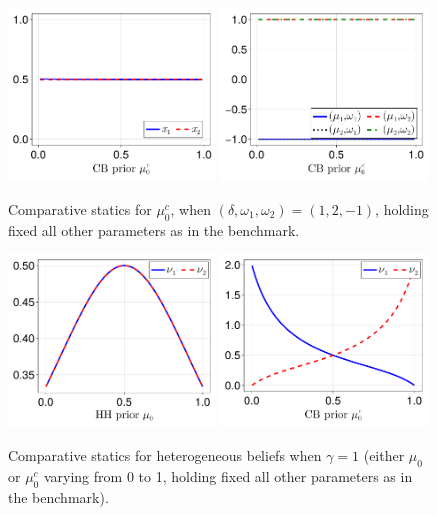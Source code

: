 \documentclass[12pt,a4paper]{article}
\begin{document}
\begin{figure}[H]
\centering
\includegraphics[width=0.49\textwidth]{figures/V8/γ_1/fig_optimal_π_across_μ_0_c_ω_1_2_ω_2_-1_δ_1.0_.pdf}
\includegraphics[width=0.49\textwidth]{figures/V8/γ_1/fig_posterior_across_μ_0_c_ω_1_2_ω_2_-1_δ_1.0_.pdf}
\caption{Comparative statics for $\mu_0^c$, when $(\delta,\omega_1,\omega_2)=(1,2,-1)$, holding fixed all other parameters as in the benchmark.}
\label{FigureA32}
\end{figure}

\begin{figure}[H]
\centering
\includegraphics[width=0.49\textwidth]{figures/V9/γ_1/fig_optimal_ν_μ_0.pdf}
\includegraphics[width=0.49\textwidth]{figures/V9/γ_1/fig_optimal_ν_μ_0_c.pdf}
\caption{Comparative statics for heterogeneous beliefs when $\gamma=1$ (either $\mu_0$ or $\mu_0^c$ varying from 0 to 1, holding fixed all other parameters as in the benchmark).}
\label{FigureA33}
\end{figure}
\end{document}
